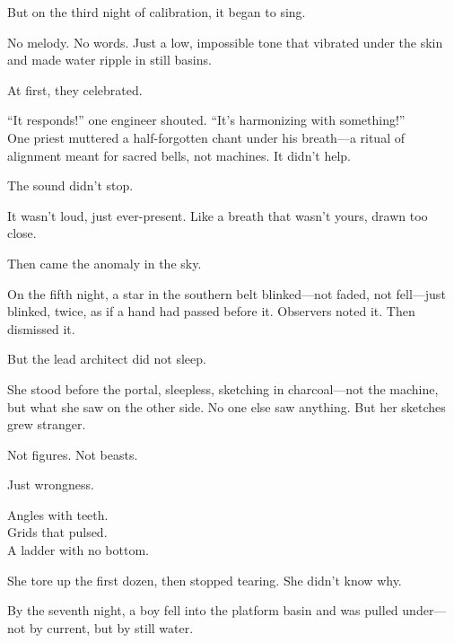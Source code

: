 \documentclass[12pt]{article}
\begin{document}
\vspace{0.5em}
But on the third night of calibration, it began to sing.

\vspace{0.5em}
No melody. No words. Just a low, impossible tone that vibrated under the skin and made water ripple in still basins.

\vspace{0.5em}
At first, they celebrated.

\vspace{0.5em}
``It responds!'' one engineer shouted. ``It’s harmonizing with something!''\\
One priest muttered a half-forgotten chant under his breath---a ritual of alignment meant for sacred bells, not machines. It didn’t help.

\vspace{0.5em}
The sound didn’t stop.

\vspace{0.5em}
It wasn’t loud, just ever-present. Like a breath that wasn’t yours, drawn too close.

\vspace{0.5em}
Then came the anomaly in the sky.

\vspace{0.5em}
On the fifth night, a star in the southern belt blinked---not faded, not fell---just blinked, twice, as if a hand had passed before it. Observers noted it. Then dismissed it.

\vspace{0.5em}
But the lead architect did not sleep.

\vspace{0.5em}
She stood before the portal, sleepless, sketching in charcoal---not the machine, but what she saw on the other side. No one else saw anything. But her sketches grew stranger.

\vspace{0.5em}
Not figures. Not beasts.

\vspace{0.5em}
Just wrongness.

\vspace{0.5em}
Angles with teeth.\\
Grids that pulsed.\\
A ladder with no bottom.

\vspace{0.5em}
She tore up the first dozen, then stopped tearing. She didn’t know why.

\vspace{0.5em}
By the seventh night, a boy fell into the platform basin and was pulled under---not by current, but by still water.
\end{document}
